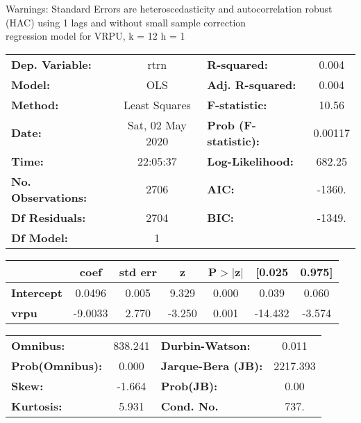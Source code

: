 Warnings: \newline
 [1] Standard Errors are heteroscedasticity and autocorrelation robust (HAC) using 1 lags and without small sample correction\\ 

regression model for VRPU, k = 12 h = 1\begin{center}
\begin{tabular}{lclc}
\toprule
\textbf{Dep. Variable:}    &       rtrn       & \textbf{  R-squared:         } &     0.004   \\
\textbf{Model:}            &       OLS        & \textbf{  Adj. R-squared:    } &     0.004   \\
\textbf{Method:}           &  Least Squares   & \textbf{  F-statistic:       } &     10.56   \\
\textbf{Date:}             & Sat, 02 May 2020 & \textbf{  Prob (F-statistic):} &  0.00117    \\
\textbf{Time:}             &     22:05:37     & \textbf{  Log-Likelihood:    } &    682.25   \\
\textbf{No. Observations:} &        2706      & \textbf{  AIC:               } &    -1360.   \\
\textbf{Df Residuals:}     &        2704      & \textbf{  BIC:               } &    -1349.   \\
\textbf{Df Model:}         &           1      & \textbf{                     } &             \\
\bottomrule
\end{tabular}
\begin{tabular}{lcccccc}
                   & \textbf{coef} & \textbf{std err} & \textbf{z} & \textbf{P$> |$z$|$} & \textbf{[0.025} & \textbf{0.975]}  \\
\midrule
\textbf{Intercept} &       0.0496  &        0.005     &     9.329  &         0.000        &        0.039    &        0.060     \\
\textbf{vrpu}      &      -9.0033  &        2.770     &    -3.250  &         0.001        &      -14.432    &       -3.574     \\
\bottomrule
\end{tabular}
\begin{tabular}{lclc}
\textbf{Omnibus:}       & 838.241 & \textbf{  Durbin-Watson:     } &    0.011  \\
\textbf{Prob(Omnibus):} &   0.000 & \textbf{  Jarque-Bera (JB):  } & 2217.393  \\
\textbf{Skew:}          &  -1.664 & \textbf{  Prob(JB):          } &     0.00  \\
\textbf{Kurtosis:}      &   5.931 & \textbf{  Cond. No.          } &     737.  \\
\bottomrule
\end{tabular}
\end{center}

